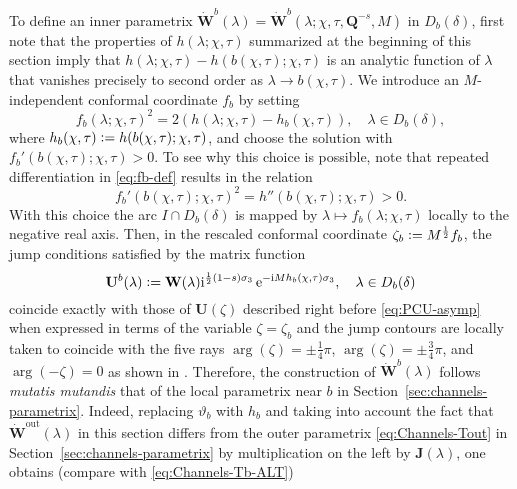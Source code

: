 To define an inner parametrix $\dot{\mathbf{W}}^b(\lambda)=\dot{\mathbf{W}}^b(\lambda;\chi,\tau,\mathbf{Q}^{-s},M)$ in $D_b(\delta)$, first note that the properties of $h(\lambda;\chi,\tau)$ summarized at the beginning of this section imply that
${h}(\lambda;\chi,\tau)-{h}(b(\chi,\tau);\chi,\tau)$ is an analytic function of $\lambda$ that vanishes precisely to second order as $\lambda \to b(\chi,\tau)$. 
We introduce an $M$-independent conformal coordinate $f_b$ by setting
\begin{equation}
f_b(\lambda;\chi,\tau)^2 = 2({h}(\lambda;\chi,\tau)-{h}_b(\chi,\tau)),\quad \lambda\in D_b(\delta),
\label{eq:fb-def}
\end{equation}
where ${h}_b(\chi,\tau)\vcentcolon= {h}(b(\chi,\tau);\chi,\tau)$,
and choose the solution with $f_b'(b(\chi,\tau);\chi,\tau)>0$. To see why this choice is possible, note that repeated differentiation in \eqref{eq:fb-def} results in the relation
\begin{equation}
f_b'(b(\chi,\tau);\chi,\tau)^2 = h''(b(\chi,\tau);\chi,\tau) > 0.
\label{eq:fb-prime-h-double-prime}
\end{equation}
With this choice
the arc $I\cap D_b(\delta)$ is mapped by $\lambda \mapsto f_b(\lambda;\chi,\tau)$ locally to the negative real axis. Then, in the rescaled conformal coordinate $\zeta_b \vcentcolon=  M^\frac{1}{2} f_b$, the jump conditions satisfied by the matrix function
\begin{equation}
\mathbf{U}^b(\lambda) \vcentcolon=  \mathbf{W}(\lambda) \mathrm{i}^{\frac{1}{2}(1-s)\sigma_3}
\,\mathrm{e}^{-\mathrm{i} M {h}_b(\chi,\tau)\sigma_3},\quad \lambda\in D_b(\delta)
\label{eq:W-transformation-b}
\end{equation}
coincide exactly with those of $\mathbf{U}(\zeta)$ described right before \eqref{eq:PCU-asymp} when expressed in terms of the variable $\zeta=\zeta_b$ and the jump contours are locally taken to coincide with the five rays $\arg(\zeta)=\pm \tfrac{1}{4}\pi$, $\arg(\zeta)=\pm \tfrac{3}{4}\pi$, and $\arg(-\zeta)=0$ as shown in \cite[Figure 9]{BilmanLM20}. Therefore, the construction of $\dot{\mathbf{W}}^b(\lambda)$ follows \emph{mutatis mutandis} that of the local parametrix near $b$ in Section~\ref{sec:channels-parametrix}. Indeed, replacing $\vartheta_b$ with $h_b$ and taking into account the fact that $\dot{\mathbf{W}}^\text{out}(\lambda)$ in this section differs from the outer parametrix \eqref{eq:Channels-Tout} in Section~\ref{sec:channels-parametrix} by multiplication on the left by $\mathbf{J}(\lambda)$, one obtains (compare with \eqref{eq:Channels-Tb-ALT})

